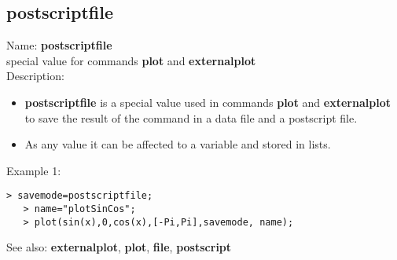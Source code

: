 \subsection{ postscriptfile }
\noindent Name: \textbf{postscriptfile}\\
special value for commands \textbf{plot} and \textbf{externalplot}\\

\noindent Description: \begin{itemize}

\item \textbf{postscriptfile} is a special value used in commands \textbf{plot} and \textbf{externalplot} to save
   the result of the command in a data file and a postscript file.

\item As any value it can be affected to a variable and stored in lists.
\end{itemize}
\noindent Example 1: 
\begin{center}\begin{minipage}{14.8cm}\begin{Verbatim}[frame=single]
   > savemode=postscriptfile;
   > name="plotSinCos";
   > plot(sin(x),0,cos(x),[-Pi,Pi],savemode, name);
\end{Verbatim}
\end{minipage}\end{center}
See also: \textbf{externalplot}, \textbf{plot}, \textbf{file}, \textbf{postscript}
